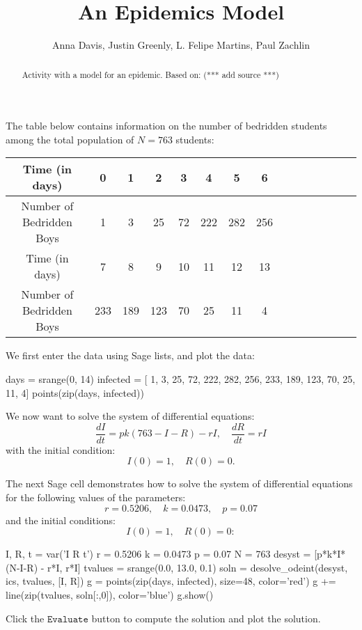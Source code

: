 \documentclass{ximera}
\title{An Epidemics Model}
\author{Anna Davis, Justin Greenly, L. Felipe Martins, Paul Zachlin}
\begin{document}
\begin{abstract}
Activity with a model for an epidemic. Based on: (*** add source ***)
\end{abstract}

\maketitle

The table below contains information on the number of bedridden students among the total population of $N=763$ students:

\begin{tabular}{|c|c|c|c|c|c|c|c|c|c|c|c|c|c|c|}\hline
Time (in days)           & 0 & 1 &  2 &  3 &  4 &    5 &   6  \\\hline
Number of Bedridden Boys & 1 & 3 & 25 & 72 & 222 & 282 & 256 \\\hline\hline
Time (in days) &             7 &   8 &   9 & 10 & 11 & 12 & 13\\\hline
Number of Bedridden Boys & 233 & 189 & 123 & 70 & 25 & 11 &  4\\\hline
\end{tabular}

We first enter the data using Sage lists, and plot the data:

\begin{sageCell}
days = srange(0, 14)
infected = [  1,   3,  25, 72, 222, 282, 256, 
            233, 189, 123, 70,  25,  11,   4]
points(zip(days, infected))
\end{sageCell}

We now want to solve the system of differential equations:
\[
\frac{dI}{dt}=pk(763-I-R)-rI,\quad\frac{dR}{dt}=rI
\]
with the initial condition:
\[
I(0)=1,\quad R(0)=0.
\]

The next Sage cell demonstrates how to solve the system of differential equations for the following values of the parameters:
\[
r = 0.5206,\quad k = 0.0473,\quad p = 0.07
\]
and the initial conditions:
\[
I(0)=1,\quad R(0)=0:
\]

\begin{sageCell}
I, R, t = var('I R t')
r = 0.5206
k = 0.0473
p = 0.07
N = 763
desyst = [p*k*I*(N-I-R) - r*I, r*I]
tvalues = srange(0.0, 13.0, 0.1)
soln = desolve_odeint(desyst, ics, tvalues, [I, R])
g = points(zip(days, infected), size=48, color='red')
g += line(zip(tvalues, soln[:,0]), color='blue')
g.show()
\end{sageCell}

Click the $\mathtt{Evaluate}$ button to compute the solution and plot the solution.
\end{document}
